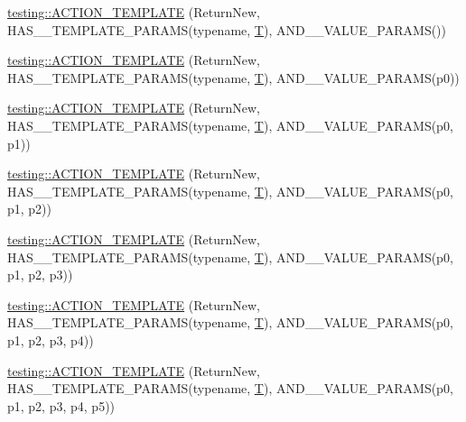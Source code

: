 \begin{DoxyCompactItemize}
\item 
\hyperlink{namespacetesting_a468e601467d018ab7566f321d3f7e871}{testing\+::\+A\+C\+T\+I\+O\+N\+\_\+\+T\+E\+M\+P\+L\+A\+TE} (Return\+New, H\+A\+S\+\_\+\_\+\+T\+E\+M\+P\+L\+A\+T\+E\+\_\+\+P\+A\+R\+A\+MS(typename, \hyperlink{functions__7_8js_adf1f3edb9115acb0a1e04209b7a9937b}{T}), A\+N\+D\+\_\+\_\+\+V\+A\+L\+U\+E\+\_\+\+P\+A\+R\+A\+MS())
\item 
\hyperlink{namespacetesting_af07e911d69b8efb03bddbd0332f79ba0}{testing\+::\+A\+C\+T\+I\+O\+N\+\_\+\+T\+E\+M\+P\+L\+A\+TE} (Return\+New, H\+A\+S\+\_\+\_\+\+T\+E\+M\+P\+L\+A\+T\+E\+\_\+\+P\+A\+R\+A\+MS(typename, \hyperlink{functions__7_8js_adf1f3edb9115acb0a1e04209b7a9937b}{T}), A\+N\+D\+\_\+\_\+\+V\+A\+L\+U\+E\+\_\+\+P\+A\+R\+A\+MS(p0))
\item 
\hyperlink{namespacetesting_ad418620ed637e789f91d029f4fe85b4b}{testing\+::\+A\+C\+T\+I\+O\+N\+\_\+\+T\+E\+M\+P\+L\+A\+TE} (Return\+New, H\+A\+S\+\_\+\_\+\+T\+E\+M\+P\+L\+A\+T\+E\+\_\+\+P\+A\+R\+A\+MS(typename, \hyperlink{functions__7_8js_adf1f3edb9115acb0a1e04209b7a9937b}{T}), A\+N\+D\+\_\+\_\+\+V\+A\+L\+U\+E\+\_\+\+P\+A\+R\+A\+MS(p0, p1))
\item 
\hyperlink{namespacetesting_ac24511eb64ebe2c2927feaf285ac3785}{testing\+::\+A\+C\+T\+I\+O\+N\+\_\+\+T\+E\+M\+P\+L\+A\+TE} (Return\+New, H\+A\+S\+\_\+\_\+\+T\+E\+M\+P\+L\+A\+T\+E\+\_\+\+P\+A\+R\+A\+MS(typename, \hyperlink{functions__7_8js_adf1f3edb9115acb0a1e04209b7a9937b}{T}), A\+N\+D\+\_\+\_\+\+V\+A\+L\+U\+E\+\_\+\+P\+A\+R\+A\+MS(p0, p1, p2))
\item 
\hyperlink{namespacetesting_afc5a3710d11bdee2023d8402b84d86ed}{testing\+::\+A\+C\+T\+I\+O\+N\+\_\+\+T\+E\+M\+P\+L\+A\+TE} (Return\+New, H\+A\+S\+\_\+\_\+\+T\+E\+M\+P\+L\+A\+T\+E\+\_\+\+P\+A\+R\+A\+MS(typename, \hyperlink{functions__7_8js_adf1f3edb9115acb0a1e04209b7a9937b}{T}), A\+N\+D\+\_\+\_\+\+V\+A\+L\+U\+E\+\_\+\+P\+A\+R\+A\+MS(p0, p1, p2, p3))
\item 
\hyperlink{namespacetesting_a0c03444379adfb849db243829946c1ed}{testing\+::\+A\+C\+T\+I\+O\+N\+\_\+\+T\+E\+M\+P\+L\+A\+TE} (Return\+New, H\+A\+S\+\_\+\_\+\+T\+E\+M\+P\+L\+A\+T\+E\+\_\+\+P\+A\+R\+A\+MS(typename, \hyperlink{functions__7_8js_adf1f3edb9115acb0a1e04209b7a9937b}{T}), A\+N\+D\+\_\+\_\+\+V\+A\+L\+U\+E\+\_\+\+P\+A\+R\+A\+MS(p0, p1, p2, p3, p4))
\item 
\hyperlink{namespacetesting_a2ef1b31693ee2be0bb93602b375fb9ce}{testing\+::\+A\+C\+T\+I\+O\+N\+\_\+\+T\+E\+M\+P\+L\+A\+TE} (Return\+New, H\+A\+S\+\_\+\_\+\+T\+E\+M\+P\+L\+A\+T\+E\+\_\+\+P\+A\+R\+A\+MS(typename, \hyperlink{functions__7_8js_adf1f3edb9115acb0a1e04209b7a9937b}{T}), A\+N\+D\+\_\+\_\+\+V\+A\+L\+U\+E\+\_\+\+P\+A\+R\+A\+MS(p0, p1, p2, p3, p4, p5))

\end{DoxyCompactItemize}
